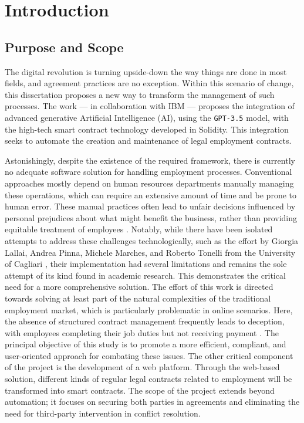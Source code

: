 \chapter{Introduction}

\section{Purpose and Scope}

The digital revolution is turning upside-down the way things are done in most fields, and agreement practices are no exception. Within this scenario of change, this dissertation proposes a new way to transform the management of such processes. The work — in collaboration with IBM — proposes the integration of advanced generative Artificial Intelligence (AI), using the \texttt{GPT-3.5} model, with the high-tech smart contract technology developed in Solidity. This integration seeks to automate the creation and maintenance of legal employment contracts.

Astonishingly, despite the existence of the required framework, there is currently no adequate software solution for handling employment processes. Conventional approaches mostly depend on human resources departments manually managing these operations, which can require an extensive amount of time and be prone to human error. These manual practices often lead to unfair decisions influenced by personal prejudices about what might benefit the business, rather than providing equitable treatment of employees \cite{Wax1998, SusanEtAl1995}. Notably, while there have been isolated attempts to address these challenges technologically, such as the effort by Giorgia Lallai, Andrea Pinna, Michele Marches, and Roberto Tonelli from the University of Cagliari \cite{lallaiETAL2020software}, their implementation had several limitations and remains the sole attempt of its kind found in academic research. This demonstrates the critical need for a more comprehensive solution. The effort of this work is directed towards solving at least part of the natural complexities of the traditional employment market, which is particularly problematic in online scenarios. Here, the absence of structured contract management frequently leads to deception, with employees completing their job duties but not receiving payment \cite{Howson2023, Shevchuk2018, Aleksynska2018, McGauran2016}. The principal objective of this study is to promote a more efficient, compliant, and user-oriented approach for combating these issues. The other critical component of the project is the development of a web platform. Through the web-based solution, different kinds of regular legal contracts related to employment will be transformed into smart contracts. The scope of the project extends beyond automation; it focuses on securing both parties in agreements and eliminating the need for third-party intervention in conflict resolution.

